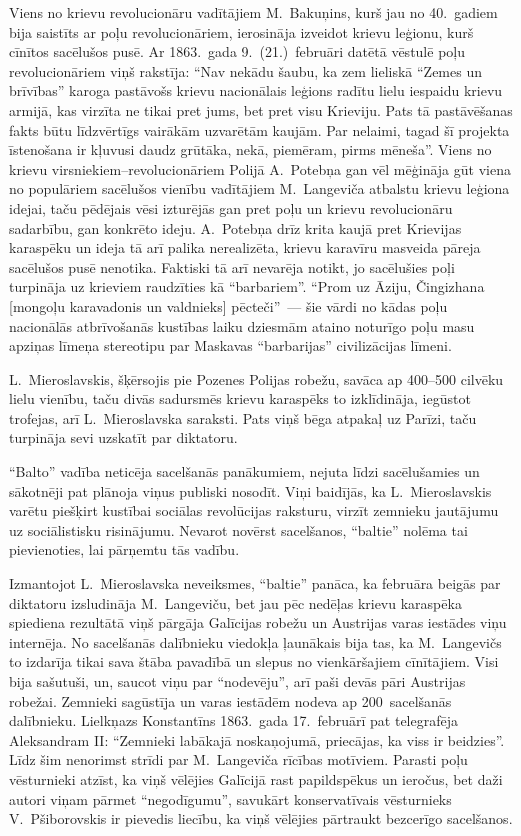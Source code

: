 \documentclass[twoside,a5paper,12pt,fleqn,openany]{extbook}
\begin{document}
Viens no krievu revolucionāru vadītājiem M.~Bakuņins, kurš jau no 40.~gadiem bija saistīts ar poļu revolucionāriem, ierosināja izveidot krievu leģionu, kurš cīnītos sacēlušos pusē. Ar 1863.~gada 9.~(21.)~februāri datētā vēstulē poļu revolucionāriem viņš rakstīja: ``Nav nekādu šaubu, ka zem lieliskā ``Zemes un brīvības'' karoga pastāvošs krievu nacionālais leģions radītu lielu iespaidu krievu armijā, kas virzīta ne tikai pret jums, bet pret visu Krieviju. Pats tā pastāvēšanas fakts būtu līdzvērtīgs vairākām uzvarētām kaujām. Par nelaimi, tagad šī projekta īstenošana ir kļuvusi daudz grūtāka, nekā, piemēram, pirms mēneša''. Viens no krievu virsniekiem--revolucionāriem Polijā A.~Potebņa gan vēl mēģināja gūt viena no populāriem sacēlušos vienību vadītājiem M.~Langeviča atbalstu krievu leģiona idejai, taču pēdējais vēsi izturējās gan pret poļu un krievu revolucionāru sadarbību, gan konkrēto ideju. A.~Potebņa drīz krita kaujā pret Krievijas karaspēku un ideja tā arī palika nerealizēta, krievu karavīru masveida pāreja sacēlušos pusē nenotika. Faktiski tā arī nevarēja notikt, jo sacēlušies poļi turpināja uz krieviem raudzīties kā ``barbariem''. ``Prom uz Āziju, Čingizhana [mongoļu karavadonis un valdnieks] pēcteči''~--- šie vārdi no kādas poļu nacionālās atbrīvošanās kustības laiku dziesmām ataino noturīgo poļu masu apziņas līmeņa stereotipu par Maskavas ``barbarijas'' civilizācijas līmeni.

L.~Mieroslavskis, šķērsojis pie Pozenes Polijas robežu, savāca ap 400--500 cilvēku lielu vienību, taču divās sadursmēs krievu karaspēks to izklīdināja, iegūstot trofejas, arī L.~Mieroslavska saraksti. Pats viņš bēga atpakaļ uz Parīzi, taču turpināja sevi uzskatīt par diktatoru.

``Balto'' vadība neticēja sacelšanās panākumiem, nejuta līdzi sacēlušamies un sākotnēji pat plānoja viņus publiski nosodīt. Viņi baidījās, ka L.~Mieroslavskis varētu piešķirt kustībai sociālas revolūcijas raksturu, virzīt zemnieku jautājumu uz sociālistisku risinājumu. Nevarot novērst sacelšanos, ``baltie'' nolēma tai pievienoties, lai pārņemtu tās vadību.

Izmantojot L.~Mieroslavska neveiksmes, ``baltie'' panāca, ka februāra beigās par diktatoru izsludināja M.~Langeviču, bet jau pēc nedēļas krievu karaspēka spiediena rezultātā viņš pārgāja Galīcijas robežu un Austrijas varas iestādes viņu internēja. No sacelšanās dalībnieku viedokļa ļaunākais bija tas, ka M.~Langevičs to izdarīja tikai sava štāba pavadībā un slepus no vienkāršajiem cīnītājiem. Visi bija sašutuši, un, saucot viņu par ``nodevēju'', arī paši devās pāri Austrijas robežai. Zemnieki sagūstīja un varas iestādēm nodeva ap 200~sacelšanās dalībnieku. Lielkņazs Konstantīns 1863.~gada 17.~februārī pat telegrafēja Aleksandram II: ``Zemnieki labākajā noskaņojumā, priecājas, ka viss ir beidzies''. Līdz šim nenorimst strīdi par M.~Langeviča rīcības motīviem. Parasti poļu vēsturnieki atzīst, ka viņš vēlējies Galīcijā rast papildspēkus un ieročus, bet daži autori viņam pārmet ``negodīgumu'', savukārt konservatīvais vēsturnieks V.~Pšiborovskis ir pievedis liecību, ka viņš vēlējies pārtraukt bezcerīgo sacelšanos.
\end{document}

